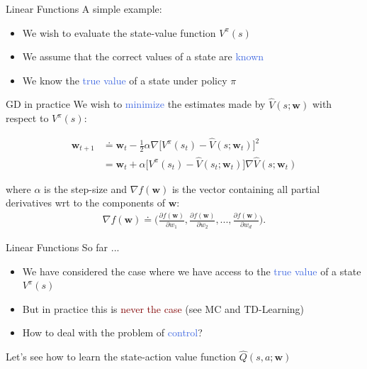 \documentclass{beamer}
\begin{document}
\begin{frame}{Linear Functions}
	A simple example:
	\begin{itemize}
		\item We wish to evaluate the state-value function $V^\pi(s)$
		\item We assume that the correct values of a state are \textcolor{RoyalBlue}{known} 
		\item We know the \textcolor{RoyalBlue}{true value} of a state under policy $\pi$
	\end{itemize}

	\begin{block}{GD in practice}
		We wish to \textcolor{RoyalBlue}{minimize} the estimates made by $\hat{V}(s;\mathbf{w})$ with respect to $V^{\pi}(s)$:
		
		\begin{align*}
			\mathbf{w}_{t+1} & \doteq \mathbf{w}_t - \frac{1}{2} \alpha\nabla\Big[V^{\pi}(s_t)-\hat{V}(s;\mathbf{w}_t)\Big]^{2} \\ 
					 & = \mathbf{w}_t +\alpha\Big[V^{\pi}(s_t)-\hat{V}(s_t;\mathbf{w}_t)\Big]\nabla \hat{V}(s;\mathbf{w}_t)
		\end{align*}

		where $\alpha$ is the step-size and $\nabla f(\mathbf{w})$ is the vector containing all partial derivatives wrt to the components of $\mathbf{w}$:
		\begin{align*}
			\nabla f(\mathbf{w}) \doteq \Big(\frac{\partial f(\mathbf{w})}{\partial w_1}, \frac{\partial f(\mathbf{w})}{\partial w_2}, ..., \frac{\partial f(\mathbf{w})}{\partial w_d}\Big).
		\end{align*}

	\end{block}
\end{frame}

\begin{frame}{Linear Functions}
	So far ...
	\begin{itemize}
		\item We have considered the case where we have access to the \textcolor{RoyalBlue}{true value} of a state $V^{\pi}(s)$
		\item But in practice this is \textcolor{Maroon}{never the case} (see MC and TD-Learning)
		\item How to deal with the problem of \textcolor{RoyalBlue}{control}?
	\end{itemize}

	\bigskip 

	Let's see how to learn the state-action value function $\hat{Q}(s,a;\mathbf{w})$

\end{frame}
\end{document}
